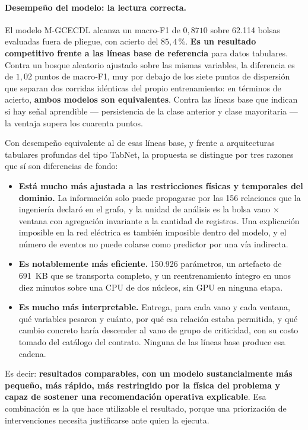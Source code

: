 \documentclass[11pt,a4paper]{article}
\begin{document}
\begin{bloquenuevo}
\paragraph{Desempeño del modelo: la lectura correcta.} El modelo M-GCECDL alcanza un macro-F1
de $0{,}8710$ sobre 62.114 bolsas evaluadas fuera de pliegue, con acierto del $85{,}4$\,\%.
\textbf{Es un resultado competitivo frente a las líneas base de referencia} para datos
tabulares. Contra un bosque aleatorio ajustado sobre las mismas variables, la diferencia es de
$1{,}02$ puntos de macro-F1, muy por debajo de los siete puntos de dispersión que separan dos
corridas idénticas del propio entrenamiento: en términos de acierto, \textbf{ambos modelos son
equivalentes}. Contra las líneas base que indican si hay señal aprendible --- persistencia de
la clase anterior y clase mayoritaria --- la ventaja supera los cuarenta puntos.

Con desempeño equivalente al de esas líneas base, y frente a arquitecturas tabulares profundas
del tipo TabNet, la propuesta se distingue por tres razones que sí son diferencias de fondo:

\begin{itemize}
  \item \textbf{Está mucho más ajustada a las restricciones físicas y temporales del dominio.}
        La información solo puede propagarse por las 156 relaciones que la ingeniería declaró
        en el grafo, y la unidad de análisis es la bolsa vano $\times$ ventana con agregación
        invariante a la cantidad de registros. Una explicación imposible en la red eléctrica es
        también imposible dentro del modelo, y el número de eventos no puede colarse como
        predictor por una vía indirecta.
  \item \textbf{Es notablemente más eficiente.} 150.926 parámetros, un artefacto de 691~KB que
        se transporta completo, y un reentrenamiento íntegro en unos diez minutos sobre una CPU
        de dos núcleos, sin GPU en ninguna etapa.
  \item \textbf{Es mucho más interpretable.} Entrega, para cada vano y cada ventana, qué
        variables pesaron y cuánto, por qué esa relación estaba permitida, y qué cambio
        concreto haría descender al vano de grupo de criticidad, con su costo tomado del
        catálogo del contrato. Ninguna de las líneas base produce esa cadena.
\end{itemize}

Es decir: \textbf{resultados comparables, con un modelo sustancialmente más pequeño, más
rápido, más restringido por la física del problema y capaz de sostener una recomendación
operativa explicable}. Esa combinación es la que hace utilizable el resultado, porque una
priorización de intervenciones necesita justificarse ante quien la ejecuta.


\end{bloquenuevo}
\end{document}
